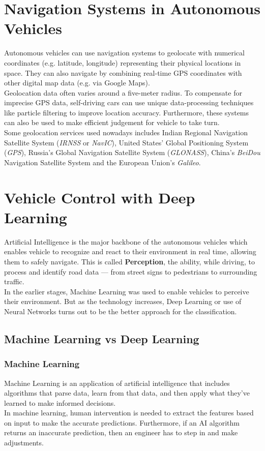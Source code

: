 \section{Navigation Systems in Autonomous Vehicles}
Autonomous vehicles can use navigation systems to geolocate with numerical coordinates (e.g. latitude, longitude) representing their physical locations in space. They can also navigate by combining real-time GPS coordinates with other digital map data (e.g. via Google Maps).
\\
Geolocation data often varies around a five-meter radius. To compensate for imprecise GPS data, self-driving cars can use unique data-processing techniques like particle filtering to improve location accuracy. Furthermore, these systems can also be used to make efficient judgement for vehicle to take turn.
\\
Some geolocation services used nowadays includes  Indian Regional Navigation Satellite System (\textit{IRNSS} or \textit{NavIC}), United States' Global Positioning System (\textit{GPS}), Russia's Global Navigation Satellite System (\textit{GLONASS}), China's \textit{BeiDou} Navigation Satellite System and the European Union's \textit{Galileo}.

\section{Vehicle Control with Deep Learning}
Artificial Intelligence is the major backbone of the autonomous vehicles which enables vehicle to recognize and react to their environment in real time, allowing them to safely navigate. This is called \textbf{Perception}, the ability, while driving, to process and identify road data — from street signs to pedestrians to surrounding traffic.
\\
In the earlier stages, Machine Learning was used to enable vehicles to perceive their environment. But as the technology increases, Deep Learning or use of Neural Networks turns out to be the better approach for the classification.

\subsection{Machine Learning vs Deep Learning}
\subsubsection{Machine Learning}
Machine Learning is an application of artificial intelligence that includes algorithms that parse data, learn from that data, and then apply what they've learned to make informed decisions.
\\
In machine learning, human intervention is needed to extract the features based on input to make the accurate predictions. Furthermore, if an AI algorithm returns an inaccurate prediction, then an engineer has to step in and make adjustments.

